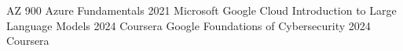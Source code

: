 


\begin{cvhonors}
  \cvhonor
    {AZ 900} %
    {Azure Fundamentals} %
    {2021} %
    {Microsoft}
  \cvhonor
    {Google Cloud} %
    {Introduction to Large Language Models} %
    {2024} %
    {Coursera} %
  \cvhonor
    {Google} %
    {Foundations of Cybersecurity} %
    {2024} %
    {Coursera} %

\end{cvhonors}